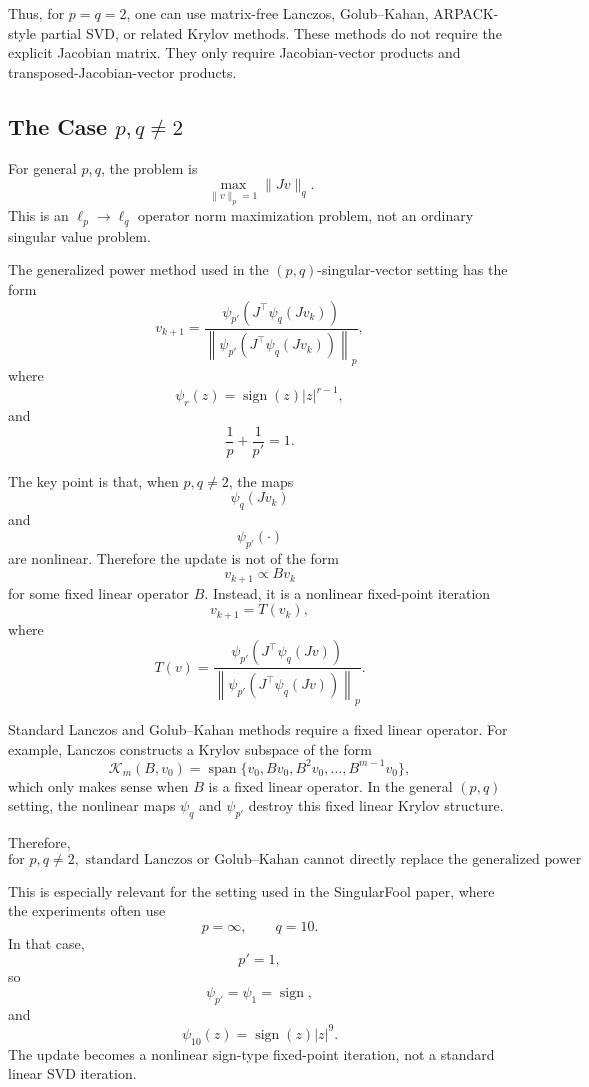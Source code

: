 \documentclass{article}
\begin{document}
Thus, for \(p=q=2\), one can use matrix-free Lanczos, Golub--Kahan, ARPACK-style partial SVD, or related Krylov methods. These methods do not require the explicit Jacobian matrix. They only require Jacobian-vector products and transposed-Jacobian-vector products.

\subsection{The Case \(p,q\neq 2\)}

For general \(p,q\), the problem is
\[
\max_{\|v\|_p=1}\|Jv\|_q.
\]
This is an \(\ell_p\to\ell_q\) operator norm maximization problem, not an ordinary singular value problem.

The generalized power method used in the \((p,q)\)-singular-vector setting has the form
\[
v_{k+1}
=
\frac{
\psi_{p'}
\left(
J^\top \psi_q(Jv_k)
\right)
}{
\left\|
\psi_{p'}
\left(
J^\top \psi_q(Jv_k)
\right)
\right\|_p
},
\]
where
\[
\psi_r(z)=\operatorname{sign}(z)|z|^{r-1},
\]
and
\[
\frac{1}{p}+\frac{1}{p'}=1.
\]

The key point is that, when \(p,q\neq 2\), the maps
\[
\psi_q(Jv_k)
\]
and
\[
\psi_{p'}(\cdot)
\]
are nonlinear. Therefore the update is not of the form
\[
v_{k+1}\propto Bv_k
\]
for some fixed linear operator \(B\). Instead, it is a nonlinear fixed-point iteration
\[
v_{k+1}=T(v_k),
\]
where
\[
T(v)
=
\frac{
\psi_{p'}
\left(
J^\top \psi_q(Jv)
\right)
}{
\left\|
\psi_{p'}
\left(
J^\top \psi_q(Jv)
\right)
\right\|_p
}.
\]

Standard Lanczos and Golub--Kahan methods require a fixed linear operator. For example, Lanczos constructs a Krylov subspace of the form
\[
\mathcal{K}_m(B,v_0)
=
\operatorname{span}
\{v_0,Bv_0,B^2v_0,\dots,B^{m-1}v_0\},
\]
which only makes sense when \(B\) is a fixed linear operator. In the general \((p,q)\) setting, the nonlinear maps \(\psi_q\) and \(\psi_{p'}\) destroy this fixed linear Krylov structure.

Therefore,
\[
\boxed{
\text{for }p,q\neq 2,\text{ standard Lanczos or Golub--Kahan cannot directly replace the generalized power method.}
}
\]

This is especially relevant for the setting used in the SingularFool paper, where the experiments often use
\[
p=\infty,\qquad q=10.
\]
In that case,
\[
p'=1,
\]
so
\[
\psi_{p'}=\psi_1=\operatorname{sign},
\]
and
\[
\psi_{10}(z)=\operatorname{sign}(z)|z|^9.
\]
The update becomes a nonlinear sign-type fixed-point iteration, not a standard linear SVD iteration.
\end{document}
